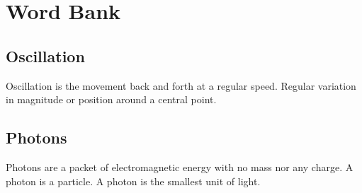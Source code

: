 \documentclass{article}
\begin{document}
\section{Word Bank}
\subsection{Oscillation}\label{sec:oscillation}
Oscillation is the movement back and forth at a regular speed. Regular variation in magnitude or position around a central point.

\subsection{Photons}\label{sec:photons}
Photons are a packet of electromagnetic energy with no mass nor any charge. A photon is a particle. A photon is the smallest unit of light.
\end{document}
